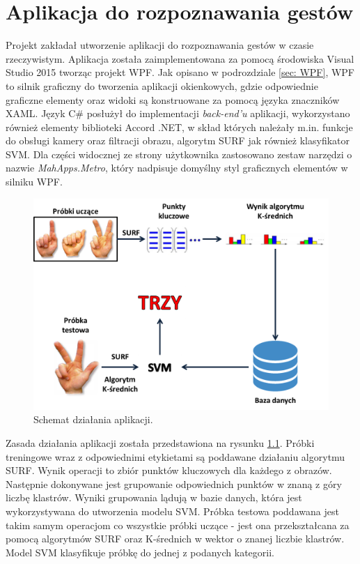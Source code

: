\chapter{Aplikacja do rozpoznawania gestów}
Projekt zakładał utworzenie aplikacji do rozpoznawania gestów w czasie rzeczywistym. Aplikacja została zaimplementowana za pomocą środowiska Visual Studio 2015 tworząc projekt WPF. Jak opisano w podrozdziale \ref{sec: WPF}, WPF to silnik graficzny do tworzenia aplikacji okienkowych, gdzie odpowiednie graficzne elementy oraz widoki są konstruowane za pomocą języka znaczników XAML. Język C\# posłużył do implementacji \textit{back-end'u} aplikacji, wykorzystano również elementy biblioteki Accord .NET, w skład których należały m.in. funkcje do obsługi kamery oraz filtracji obrazu, algorytm SURF jak również klasyfikator SVM. Dla części widocznej ze strony użytkownika zastosowano zestaw narzędzi o nazwie \textit{MahApps.Metro}, który nadpisuje domyślny styl graficznych elementów w silniku WPF.

\begin{figure}[h]
	\centering
	\includegraphics[width=16cm]{ApplicationFlowChart}
	\centering
	\caption{Schemat działania aplikacji.}
	\label{im: ApplicationFlowChart}
\end{figure}

Zasada działania aplikacji została przedstawiona na rysunku \ref{im: ApplicationFlowChart}. Próbki treningowe wraz z odpowiednimi etykietami są poddawane działaniu algorytmu SURF. Wynik operacji to zbiór punktów kluczowych dla każdego z obrazów. Następnie dokonywane jest grupowanie odpowiednich punktów w znaną z góry liczbę klastrów. Wyniki grupowania lądują w bazie danych, która jest wykorzystywana do utworzenia modelu SVM. 
Próbka testowa poddawana jest takim samym operacjom co wszystkie próbki uczące - jest ona przekształcana za pomocą algorytmów SURF oraz K-średnich w wektor o znanej liczbie klastrów. Model SVM klasyfikuje próbkę do jednej z podanych kategorii. 

